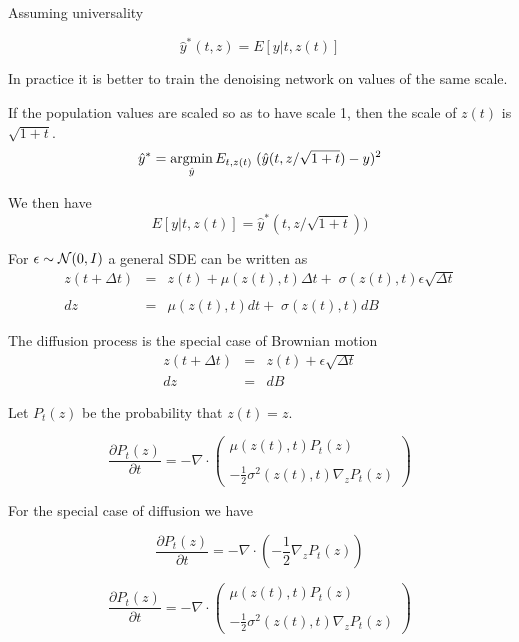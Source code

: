 {\vfill
Assuming universality

\vfill
$$\hat{y}^*(t,z) = E[y|t,z(t)]$$

In practice it is better to train the denoising network on values of the same scale.

\vfill
If the population values are scaled so as to have scale 1, then the scale of $z(t)$ is $\sqrt{1+t}$.
$$\hat{y}^* = \operatorname*{argmin}_{\hat{y}} E_{t,z(t)} \; (\hat{y}(t,z/\sqrt{1+t}) - y)^2$$

\vfill
We then have
$$E[y|t,z(t)] = \hat{y}^*(t,z/\sqrt{1+t}))$$


For $\epsilon \sim {\cal N}(0,I)$ a general SDE can be written as
\begin{eqnarray*}
z(t+\Delta t) & = & z(t) + \mu(z(t),t)\Delta t + \; \sigma(z(t),t)\epsilon\sqrt{\Delta t} \\
\\
dz & = & \mu(z(t),t)dt + \; \sigma(z(t),t)dB
\end{eqnarray*}

\vfill
The diffusion process is the special case of Brownian motion
\begin{eqnarray*}
z(t + \Delta t) & = & z(t) + \epsilon \sqrt{\Delta t} \\
dz & = & dB
\end{eqnarray*}


Let $P_t(z)$ be the probability that $z(t) = z$.

$$\frac{\partial P_t(z)}{\partial t} = - \nabla \cdot\left(\begin{array}{l}\mu(z(t),t)P_t(z) \\ \\ - \frac{1}{2}\sigma^2(z(t),t) \nabla_z P_t(z)\end{array}\right)$$

\vfill
For the special case of diffusion we have

$$\frac{\partial P_t(z)}{\partial t} = - \nabla \cdot\left(-\frac{1}{2}\nabla_z P_t(z)\right)$$


$$\frac{\partial P_t(z)}{\partial t} = - \nabla \cdot\left(\begin{array}{l}\mu(z(t),t)P_t(z) \\ \\ - \frac{1}{2}\sigma^2(z(t),t) \nabla_z P_t(z)\end{array}\right)$$

}
